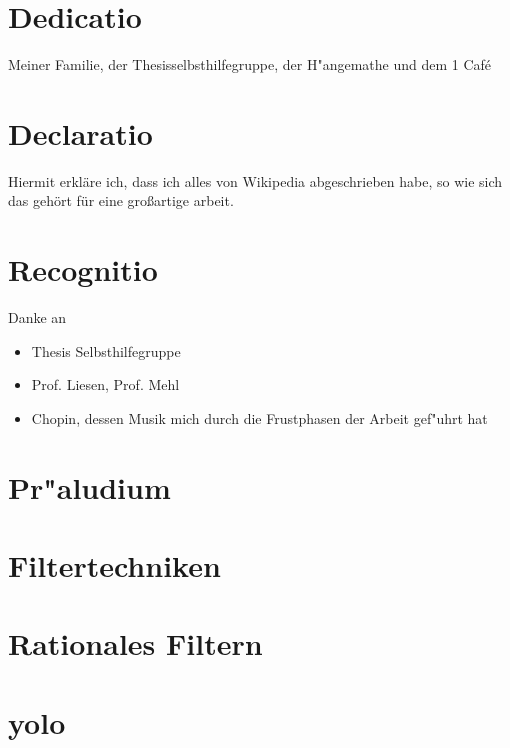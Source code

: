 \documentclass[11pt, twoside]{report} %
\begin{document}


\chapter*{Dedicatio}
Meiner Familie, der Thesisselbsthilfegruppe, der H"angemathe und dem 1 Café

\chapter*{Declaratio}
Hiermit erkläre ich, dass ich alles von Wikipedia abgeschrieben habe, so
wie sich das gehört für eine großartige arbeit.

\chapter*{Recognitio}
Danke an
\begin{itemize}
\item Thesis Selbsthilfegruppe
\item Prof. Liesen, Prof. Mehl
\item Chopin, dessen Musik mich durch die Frustphasen der Arbeit gef"uhrt hat
\end{itemize}

\tableofcontents

\chapter{Pr"aludium}%


\chapter{Filtertechniken} %


\chapter{Rationales Filtern}%


%

%

\appendix
\chapter{yolo}


\nocite{*}
\printbibliography
\end{document}

